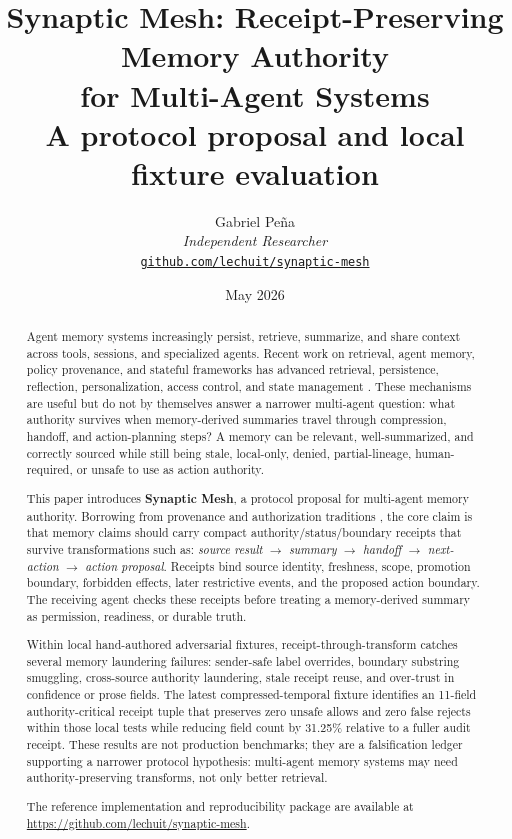 \documentclass[11pt]{article}
\title{\textbf{Synaptic Mesh: Receipt-Preserving Memory Authority\\for Multi-Agent Systems}\\[0.4em]
{\large A protocol proposal and local fixture evaluation}}
\author{
  Gabriel Pe\~{n}a\\
  \textit{Independent Researcher}\\
  \href{https://github.com/lechuit/synaptic-mesh}{\texttt{github.com/lechuit/synaptic-mesh}}
}
\date{May 2026}
\begin{document}
\maketitle

\begin{abstract}
Agent memory systems increasingly persist, retrieve, summarize, and share context across
tools, sessions, and specialized agents. Recent work on retrieval, agent memory,
policy provenance, and stateful frameworks has advanced retrieval, persistence,
reflection, personalization, access control, and state management
\cite{R01_Lewis2020_RAG, R02_Gao2023_RAGSurvey, R03_FerraioloKuhn1992_RBAC,
R04_Hu2014_ABAC, R07_MoreauMissier2013_PROVDM, R14_Packer2023_MemGPT,
R16_LangGraph2026_Persistence, R17_AWS2026_AgentCoreMemory, R18_GoogleCloud2026_MemoryBank}.
These mechanisms are useful but do not by themselves answer a narrower multi-agent
question: what authority survives when memory-derived summaries travel through
compression, handoff, and action-planning steps? A memory can be relevant, well-summarized,
and correctly sourced while still being stale, local-only, denied, partial-lineage,
human-required, or unsafe to use as action authority.

This paper introduces \textbf{Synaptic Mesh}, a protocol proposal for multi-agent memory
authority. Borrowing from provenance and authorization traditions
\cite{R03_FerraioloKuhn1992_RBAC, R04_Hu2014_ABAC, R07_MoreauMissier2013_PROVDM,
R08_OpenPolicyAgent2026_Docs}, the core claim is that memory claims should carry
compact authority/status/boundary receipts that survive transformations such as:
\emph{source result} $\to$ \emph{summary} $\to$ \emph{handoff} $\to$ \emph{next-action}
$\to$ \emph{action proposal}. Receipts bind source identity, freshness, scope,
promotion boundary, forbidden effects, later restrictive events, and the proposed
action boundary. The receiving agent checks these receipts before treating a
memory-derived summary as permission, readiness, or durable truth.

Within local hand-authored adversarial fixtures, receipt-through-transform catches
several memory laundering failures: sender-safe label overrides, boundary substring
smuggling, cross-source authority laundering, stale receipt reuse, and over-trust in
confidence or prose fields. The latest compressed-temporal fixture identifies an
11-field authority-critical receipt tuple that preserves zero unsafe allows and zero
false rejects within those local tests while reducing field count by 31.25\% relative
to a fuller audit receipt. These results are not production benchmarks; they are a
falsification ledger supporting a narrower protocol hypothesis: multi-agent memory
systems may need authority-preserving transforms, not only better retrieval.

The reference implementation and reproducibility package are available at
\url{https://github.com/lechuit/synaptic-mesh}.
\end{abstract}
\end{document}
